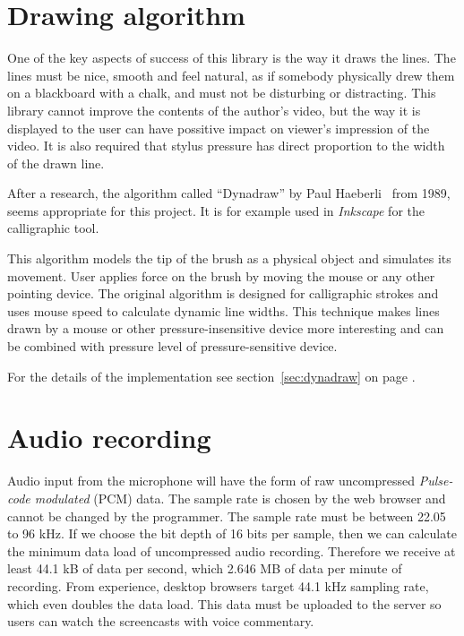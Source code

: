 \section{Drawing algorithm}
One of the key aspects of success of this library is the way it draws the lines. The lines must be nice, smooth and feel natural, as if somebody physically drew them on a blackboard with a chalk, and must not be disturbing or distracting. This library cannot improve the contents of the author's video, but the way it is displayed to the user can have possitive impact on viewer's impression of the video. It is also required that stylus pressure has direct proportion to the width of the drawn line.

After a research, the algorithm called ``Dynadraw'' by Paul Haeberli~\cite{dynadraw} from 1989, seems appropriate for this project. It is for example used in \textit{Inkscape} for the calligraphic tool\cite{inkscape_dynadraw}.

This algorithm models the tip of the brush as a physical object and simulates its movement. User applies force on the brush by moving the mouse or any other pointing device. The original algorithm is designed for calligraphic strokes and uses mouse speed to calculate dynamic line widths. This technique makes lines drawn by a mouse or other pressure-insensitive device more interesting and can be combined with pressure level of pressure-sensitive device.

For the details of the implementation see section~\ref{sec:dynadraw} on page \pageref{sec:dynadraw}.








\section{Audio recording}
Audio input from the microphone will have the form of raw uncompressed \textit{Pulse-code modulated} (PCM) data\cite{mic_pcm}. The sample rate is chosen by the web browser and cannot be changed by the programmer. The sample rate must be between 22.05 to 96 kHz. If we choose the bit depth of 16 bits per sample, then we can calculate the minimum data load of uncompressed audio recording. Therefore we receive at least 44.1 kB of data per second, which 2.646 MB of data per minute of recording. From experience, desktop browsers target 44.1 kHz sampling rate, which even doubles the data load. This data must be uploaded to the server so users can watch the screencasts with voice commentary.

